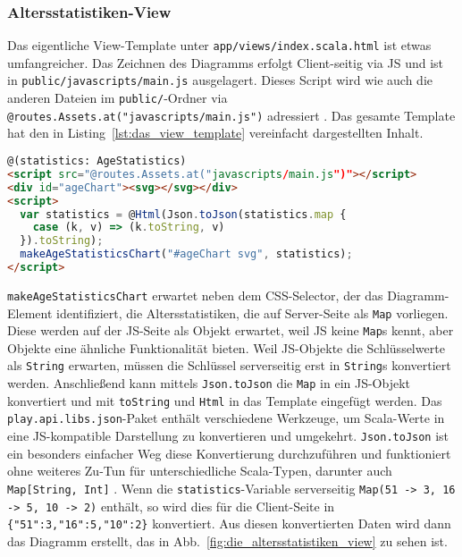 
\subsubsection{Altersstatistiken-View} %
\label{ssub:altersstatistiken_view}

Das eigentliche View-Template unter \lstinline|app/views/index.scala.html| ist etwas umfangreicher.
Das Zeichnen des Diagramms erfolgt Client-seitig via JS und ist in \lstinline|public/javascripts/main.js| ausgelagert.
Dieses Script wird wie auch die anderen Dateien im \lstinline|public/|-Ordner via \lstinline|@routes.Assets.at("javascripts/main.js")| adressiert \cite[vgl.][S.~111]{play_for_scala}.
Das gesamte Template hat den in Listing~\ref{lst:das_view_template} vereinfacht dargestellten Inhalt.

\begin{lstlisting}[language=html,caption=Das View-Template, label=lst:das_view_template]
@(statistics: AgeStatistics)
<script src="@routes.Assets.at("javascripts/main.js")"></script>
<div id="ageChart"><svg></svg></div>
<script>
  var statistics = @Html(Json.toJson(statistics.map {
    case (k, v) => (k.toString, v)
  }).toString);
  makeAgeStatisticsChart("#ageChart svg", statistics);
</script>
\end{lstlisting}

\lstinline|makeAgeStatisticsChart| erwartet neben dem CSS-Selector, der das Diagramm-Element identifiziert, die Altersstatistiken, die auf Server-Seite als \lstinline|Map| vorliegen.
Diese werden auf der JS-Seite als Objekt erwartet, weil JS keine \lstinline|Map|s kennt, aber Objekte eine ähnliche Funktionalität bieten.
Weil JS-Objekte die Schlüsselwerte als \lstinline|String| erwarten, müssen die Schlüssel serverseitig erst in \lstinline|String|s konvertiert werden.
Anschließend kann mittels \lstinline|Json.toJson| die \lstinline|Map| in ein JS-Objekt konvertiert und mit \lstinline|toString| und \lstinline|Html| in das Template eingefügt werden.
Das \lstinline|play.api.libs.json|-Paket enthält verschiedene Werkzeuge, um Scala-Werte in eine JS-kompatible Darstellung zu konvertieren und umgekehrt.
\lstinline|Json.toJson| ist ein besonders einfacher Weg diese Konvertierung durchzuführen und funktioniert ohne weiteres Zu-Tun für unterschiedliche Scala-Typen, darunter auch \lstinline|Map[String, Int]| \cite[vgl.][S.~214--215]{play_for_scala}.
Wenn die \lstinline|statistics|-Variable serverseitig \lstinline|Map(51 -> 3, 16 -> 5, 10 -> 2)| enthält, so wird dies für die Client-Seite in \lstinline|{"51":3,"16":5,"10":2}| konvertiert.
Aus diesen konvertierten Daten wird dann das Diagramm erstellt, das in Abb.~\ref{fig:die_altersstatistiken_view} zu sehen ist.

